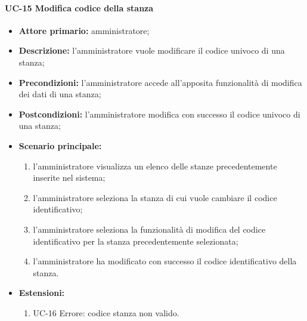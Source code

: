 \paragraph{UC-15 Modifica codice della stanza}
\begin{itemize}
	\item \textbf{Attore primario:} amministratore;
	\item\textbf{Descrizione:} l'amministratore vuole modificare il codice univoco di una stanza;
	\item\textbf{Precondizioni:} l'amministratore accede all'apposita funzionalità di modifica dei dati di una stanza;
	\item\textbf{Postcondizioni:} l'amministratore modifica con successo il codice univoco di una stanza;
	\item \textbf{Scenario principale:}
	      \begin{enumerate}
		      \item l'amministratore visualizza un elenco delle stanze precedentemente inserite nel sistema;
		      \item l'amministratore seleziona la stanza di cui vuole cambiare il codice identificativo;
		      \item l'amministratore seleziona la funzionalità di modifica del codice identificativo per la stanza precedentemente selezionata;
		      \item l'amministratore ha modificato con successo il codice identificativo della stanza.
	      \end{enumerate}
	\item \textbf{Estensioni:}
		\begin{enumerate}
		      \item UC-16 Errore: codice stanza non valido.
	      \end{enumerate}
\end{itemize}

